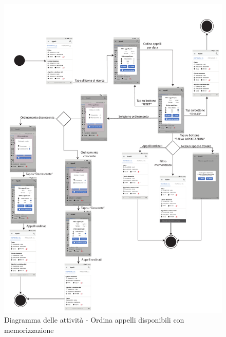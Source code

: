 \begin{figure}
	\centering
	\includegraphics[width=6in]{imgs/gruppo1/activity_diagrams/AD10_ordina_appelli.pdf}
	\caption{Diagramma delle attività - Ordina appelli disponibili con memorizzazione}
	\label{diag:ordinaAppelliDisponibiliConMemAD}
\end{figure}
\newpage


